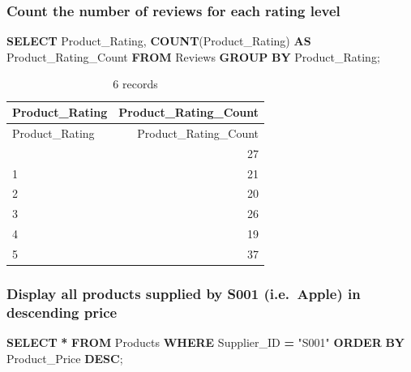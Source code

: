 \documentclass[
]{article}
\newenvironment{Shaded}{\begin{snugshade}}{\end{snugshade}}
\newcommand{\FunctionTok}[1]{\textcolor[rgb]{0.13,0.29,0.53}{\textbf{#1}}}
\newcommand{\KeywordTok}[1]{\textcolor[rgb]{0.13,0.29,0.53}{\textbf{#1}}}
\newcommand{\NormalTok}[1]{#1}
\newcommand{\OperatorTok}[1]{\textcolor[rgb]{0.81,0.36,0.00}{\textbf{#1}}}
\newcommand{\OtherTok}[1]{\textcolor[rgb]{0.56,0.35,0.01}{#1}}
\begin{document}
\hypertarget{count-the-number-of-reviews-for-each-rating-level}{%
\subsubsection{Count the number of reviews for each rating
level}\label{count-the-number-of-reviews-for-each-rating-level}}

\begin{Shaded}
\begin{Highlighting}[]

\KeywordTok{SELECT}\NormalTok{ Product\_Rating, }\FunctionTok{COUNT}\NormalTok{(Product\_Rating) }\KeywordTok{AS}\NormalTok{ Product\_Rating\_Count}
\KeywordTok{FROM}\NormalTok{ Reviews}
\KeywordTok{GROUP} \KeywordTok{BY}\NormalTok{ Product\_Rating;}
\end{Highlighting}
\end{Shaded}

\begin{longtable}[]{@{}lr@{}}
\caption{6 records}\tabularnewline
\toprule\noalign{}
Product\_Rating & Product\_Rating\_Count \\
\midrule\noalign{}
\endfirsthead
\toprule\noalign{}
Product\_Rating & Product\_Rating\_Count \\
\midrule\noalign{}
\endhead
\bottomrule\noalign{}
\endlastfoot
0 & 27 \\
1 & 21 \\
2 & 20 \\
3 & 26 \\
4 & 19 \\
5 & 37 \\
\end{longtable}

\hypertarget{display-all-products-supplied-by-s001-i.e.-apple-in-descending-price}{%
\subsubsection{Display all products supplied by S001 (i.e.~Apple) in
descending
price}\label{display-all-products-supplied-by-s001-i.e.-apple-in-descending-price}}

\begin{Shaded}
\begin{Highlighting}[]

\KeywordTok{SELECT} \OperatorTok{*}
\KeywordTok{FROM}\NormalTok{ Products }
\KeywordTok{WHERE}\NormalTok{ Supplier\_ID }\OperatorTok{=} \OtherTok{"S001"}
\KeywordTok{ORDER} \KeywordTok{BY}\NormalTok{ Product\_Price }\KeywordTok{DESC}\NormalTok{;}
\end{Highlighting}
\end{Shaded}
\end{document}
